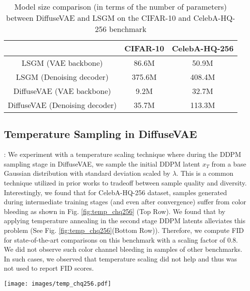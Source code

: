 \documentclass[10pt]{article} \usepackage[accepted]{tmlr}
\begin{document}
\begin{table}[t]
\centering
\footnotesize
\begin{tabular}{@{}ccc@{}}
\toprule
                               & CIFAR-10 & CelebA-HQ-256 \\ \midrule
LSGM (VAE backbone)            & 86.6M    & 50.9M         \\
LSGM (Denoising decoder)       & 375.6M   & 408.4M        \\
DiffuseVAE (VAE backbone)      & 9.2M     & 32.7M         \\
DiffuseVAE (Denoising decoder) & 35.7M    & 113.3M        \\ \bottomrule
\end{tabular}
\caption{Model size comparison (in terms of the number of parameters) between DiffuseVAE and LSGM on the CIFAR-10 and CelebA-HQ-256 benchmark}
\label{table:model_compare}
\end{table}

\subsection{Temperature Sampling in DiffuseVAE}:
We experiment with a temperature scaling technique where during the DDPM sampling stage in DiffuseVAE, we sample the initial DDPM latent $x_T$ from a base Gaussian distribution with standard deviation scaled by $\lambda$. This is a common technique utilized in prior works \citep{vahdat2021nvae, Kingma2018GlowGF} to tradeoff between sample quality and diversity. Interestingly, we found that for CelebA-HQ-256 dataset, samples generated during intermediate training stages (and even after convergence) suffer from color bleeding as shown in Fig. \ref{fig:temp_chq256} (Top Row). We found that by applying temperature annealing in the second stage DDPM latents alleviates this problem (See Fig. \ref{fig:temp_chq256}(Bottom Row)). Therefore, we compute FID for state-of-the-art comparisons on this benchmark with a scaling factor of 0.8. We did not observe such color channel bleeding in samples of other benchmarks. In such cases, we observed that temperature scaling did not help and thus was not used to report FID scores.

\begin{figure*}[h]
  \centering
    \texttt{[image: images/temp\_chq256.pdf]}
    \caption{Effect of temperature sampling in DDPM latents in DiffuseVAE. (Top Row) Samples generated with $\lambda=1.0$. (Bottom Row) Samples generated with $\lambda=0.8$}
    \label{fig:temp_chq256}
\end{figure*}
\end{document}
